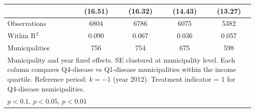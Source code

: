 {\begin{tabular}{l*{4}{c}}
                    &     (16.51)         &     (16.32)         &     (14.43)         &     (13.27)         \\
\midrule
Observations        &        6804         &        6786         &        6075         &        5382         \\
Within R$^2$        &       0.090         &       0.067         &       0.036         &       0.057         \\
Municipalities      &         756         &         754         &         675         &         598         \\
\bottomrule
\multicolumn{5}{l}{\footnotesize Municipality and year fixed effects. SE clustered at municipality level. Each column compares Q4-disease vs Q1-disease municipalities within the income quartile. Reference period: $k = -1$ (year 2012). Treatment indicator = 1 for Q4-disease municipalities.}\\
\multicolumn{5}{l}{\footnotesize \sym{*} \(p<0.1\), \sym{**} \(p<0.05\), \sym{***} \(p<0.01\)}\\
\end{tabular}
}
